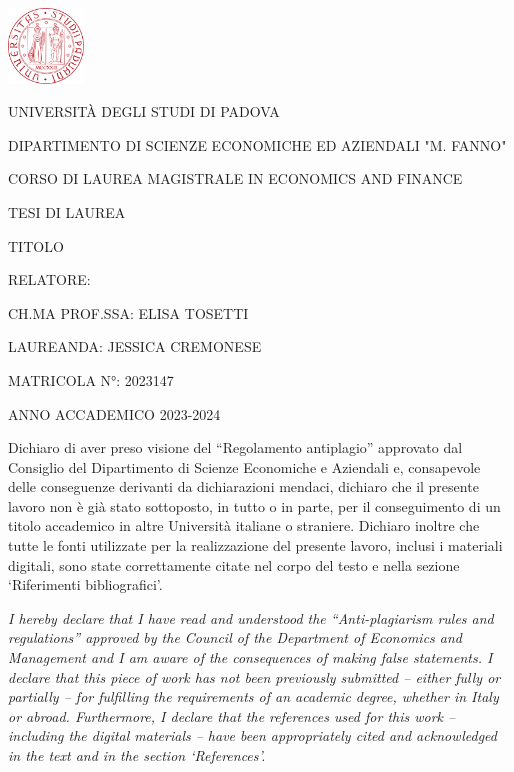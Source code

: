 \documentclass[12 pt , a4 paper , twoside , openright ]{book}
\begin{document}
\frontmatter
\begin{titlepage}
    \centering
    \includegraphics[width=2cm]{GRAPHS/logounipd.png}

    \vspace{1cm}
    {\large UNIVERSITÀ DEGLI STUDI DI PADOVA}

    \vspace{1cm}
    {DIPARTIMENTO DI SCIENZE ECONOMICHE ED AZIENDALI "M. FANNO"}

    \vspace{0.3cm}
    {CORSO DI LAUREA MAGISTRALE IN ECONOMICS AND FINANCE}

    \vspace{3.5cm}
    {TESI DI LAUREA}

    {TITOLO}

    \vspace{4cm}
    \begin{flushleft}
        RELATORE:
        
        CH.MA PROF.SSA: ELISA TOSETTI
    \end{flushleft}

    \vspace{1cm}

    \begin{flushright}
        LAUREANDA: JESSICA CREMONESE
        
        MATRICOLA N°: 2023147
    \end{flushright}

    \centering 
    \vfill
    {ANNO ACCADEMICO 2023-2024}
\end{titlepage}

Dichiaro di aver preso visione del “Regolamento antiplagio” approvato dal Consiglio del Dipartimento di Scienze Economiche e Aziendali e, consapevole delle conseguenze derivanti da dichiarazioni mendaci, dichiaro che il presente lavoro non è già stato sottoposto, in tutto o in parte, per il conseguimento di un titolo accademico in altre Università italiane o straniere. Dichiaro inoltre che tutte le fonti utilizzate per la realizzazione del presente lavoro, inclusi i materiali digitali, sono state correttamente citate nel corpo del testo e nella sezione ‘Riferimenti bibliografici’. 

\emph{I hereby declare that I have read and understood the “Anti-plagiarism rules and regulations” approved by the Council of the Department of Economics and Management and I am aware of the consequences of making false statements. I declare that this piece of work has not been previously submitted – either fully or partially – for fulfilling the requirements of an academic degree, whether in Italy or abroad. Furthermore, I declare that the references used for this work – including the digital materials – have been appropriately cited and acknowledged in the text and in the section ‘References’. }
\end{document}
